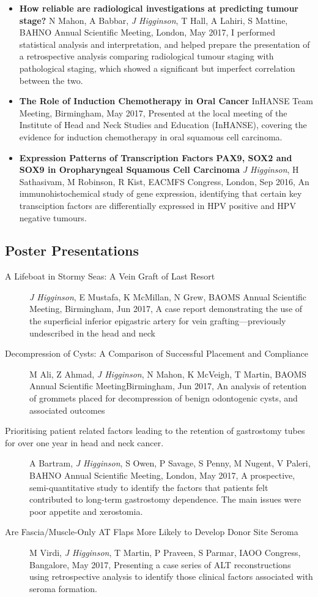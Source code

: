 \begin{itemize}
        \item\textbf{How reliable are radiological investigations at predicting tumour stage?} N Mahon, A Babbar, \emph{J Higginson}, T Hall, A Lahiri, S Mattine, BAHNO Annual Scientific Meeting, London, May 2017, I performed statistical analysis and interpretation, and helped prepare the presentation of a retrospective analysis comparing radiological tumour staging with pathological staging, which showed a significant but imperfect correlation between the two.
        \item\textbf{The Role of Induction Chemotherapy in Oral Cancer} InHANSE Team Meeting, Birmingham, May 2017, Presented at the local meeting of the Institute of Head and Neck Studies and Education (InHANSE), covering the evidence for induction chemotherapy in oral squamous cell carcinoma.
        \item\textbf{Expression Patterns of Transcription Factors PAX9, SOX2 and SOX9 in Oropharyngeal Squamous Cell Carcinoma} \emph{J Higginson}, H Sathasivam, M Robinson, R Kist, EACMFS Congress, London, Sep 2016, An immunohistochemical study of gene expression, identifying that certain key transciption factors are differentially expressed in HPV positive and HPV negative tumours.
\end{itemize}


\subsection*{Poster Presentations}
\begin{description}
        \item[A Lifeboat in Stormy Seas: A Vein Graft of Last Resort]{\emph{J Higginson}, E Mustafa, K McMillan, N Grew, BAOMS Annual Scientific Meeting, Birmingham, Jun 2017, A case report demonstrating the use of the superficial inferior epigastric artery for vein grafting---previously undescribed in the head and neck}
        \item[Decompression of Cysts: A Comparison of Successful Placement and Compliance]{M Ali, Z Ahmad, \emph{J Higginson}, N Mahon, K McVeigh, T Martin, BAOMS Annual Scientific Meeting}{Birmingham, Jun 2017, An analysis of retention of grommets placed for decompression of benign odontogenic cysts, and associated outcomes}
        \item[Prioritising patient related factors leading to the retention of gastrostomy tubes for over one year in head and neck cancer.]{A Bartram, \emph{J Higginson}, S Owen, P Savage, S Penny, M Nugent, V Paleri, BAHNO Annual Scientific Meeting, London, May 2017, A prospective, semi-quantitative study to identify the factors that patients felt contributed to long-term gastrostomy dependence. The main issues were poor appetite and xerostomia.}
        \item[Are Fascia/Muscle-Only AT Flaps More Likely to Develop Donor Site Seroma]{M Virdi, \emph{J Higginson}, T Martin, P Praveen, S Parmar, IAOO Congress, Bangalore, May 2017, Presenting a case series of ALT reconstructions using retrospective analysis to identify those clinical factors associated with seroma formation.}
\end{description}
